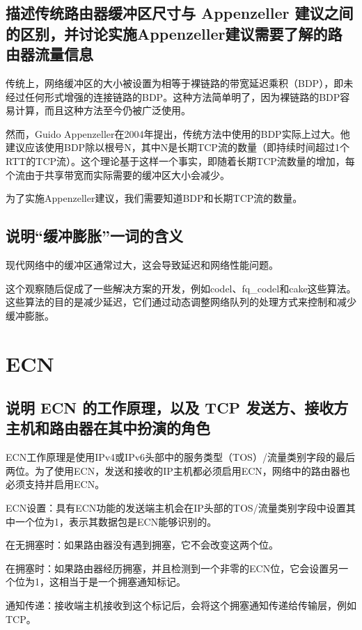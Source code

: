 \subsection{描述传统路由器缓冲区尺寸与 Appenzeller 建议之间的区别，并讨论实施Appenzeller建议需要了解的路由器流量信息}

传统上，网络缓冲区的大小被设置为相等于裸链路的带宽延迟乘积（BDP），即未经过任何形式增强的连接链路的BDP。这种方法简单明了，因为裸链路的BDP容易计算，而且这种方法至今仍被广泛使用。

然而，Guido Appenzeller在2004年提出，传统方法中使用的BDP实际上过大。他建议应该使用BDP除以根号N，其中N是长期TCP流的数量（即持续时间超过1个RTT的TCP流）。这个理论基于这样一个事实，即随着长期TCP流数量的增加，每个流由于共享带宽而实际需要的缓冲区大小会减少。

为了实施Appenzeller建议，我们需要知道BDP和长期TCP流的数量。

\subsection{说明``缓冲膨胀''一词的含义}

现代网络中的缓冲区通常过大，这会导致延迟和网络性能问题。

这个观察随后促成了一些解决方案的开发，例如codel、fq\_codel和cake这些算法。这些算法的目的是减少延迟，它们通过动态调整网络队列的处理方式来控制和减少缓冲膨胀。

\section{ECN}

\subsection{说明 ECN 的工作原理，以及 TCP 发送方、接收方主机和路由器在其中扮演的角色}

ECN工作原理是使用IPv4或IPv6头部中的服务类型（TOS）/流量类别字段的最后两位。为了使用ECN，发送和接收的IP主机都必须启用ECN，网络中的路由器也必须支持并启用ECN。

ECN设置：具有ECN功能的发送端主机会在IP头部的TOS/流量类别字段中设置其中一个位为1，表示其数据包是ECN能够识别的。

在无拥塞时：如果路由器没有遇到拥塞，它不会改变这两个位。

在拥塞时：如果路由器经历拥塞，并且检测到一个非零的ECN位，它会设置另一个位为1，这相当于是一个拥塞通知标记。

通知传递：接收端主机接收到这个标记后，会将这个拥塞通知传递给传输层，例如TCP。

